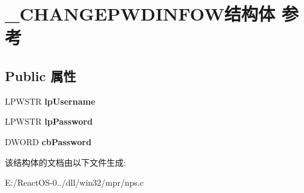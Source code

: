 \hypertarget{struct___c_h_a_n_g_e_p_w_d_i_n_f_o_w}{}\section{\+\_\+\+C\+H\+A\+N\+G\+E\+P\+W\+D\+I\+N\+F\+O\+W结构体 参考}
\label{struct___c_h_a_n_g_e_p_w_d_i_n_f_o_w}
\subsection*{Public 属性}
\begin{DoxyCompactItemize}
\item 
\mbox{\label{struct___c_h_a_n_g_e_p_w_d_i_n_f_o_w_a9cc4995d02671bffe2c986debbcfca8d}} 
L\+P\+W\+S\+TR {\bfseries lp\+Username}
\item 
\mbox{\label{struct___c_h_a_n_g_e_p_w_d_i_n_f_o_w_a77a52949b1715968bf9d5466fea14775}} 
L\+P\+W\+S\+TR {\bfseries lp\+Password}
\item 
\mbox{\label{struct___c_h_a_n_g_e_p_w_d_i_n_f_o_w_abb723c63fcd9683603bedfacd245a2bd}} 
D\+W\+O\+RD {\bfseries cb\+Password}
\end{DoxyCompactItemize}


该结构体的文档由以下文件生成\+:\begin{DoxyCompactItemize}
\item 
E\+:/\+React\+O\+S-\/0../dll/win32/mpr/nps.\+c\end{DoxyCompactItemize}
